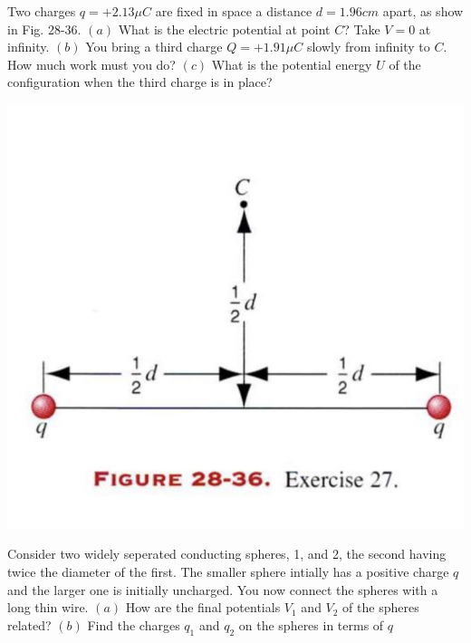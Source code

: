 \documentclass[11pt,letterpaper,boxed]{hmcpset}
\begin{document}
\begin{problem}[HRK P28.27	]
Two  charges  $q= +2.13 \mu C$ are fixed in space a distance $d= 1.96 cm$ apart, as show in Fig. 28-36. $(a)$ What is the electric potential at point $C$? Take $V= 0$ at infinity. $(b)$ You bring a third charge $Q = + 1.91 \mu C$ slowly from infinity to $C$. How much work must you do? $(c)$ What is the potential energy $U$ of the configuration when the third charge is in place?
\begin{center}
\includegraphics[scale=0.6]{28-36.png}
\end{center}
\end{problem}

\begin{solution}
\vfill
\end{solution}
\newpage

\begin{problem}[HRK P28.42]
Consider two widely seperated conducting spheres, 1, and 2, the second having twice the diameter of the first. The smaller sphere intially has a positive charge $q$ and the larger one is initially uncharged. You now connect the spheres with a long  thin wire. $(a)$ How are the final potentials $V_1$ and $V_2$ of the spheres related? $(b)$ Find the charges $q_1$ and $q_2$ on the spheres in terms of $q$ 
\end{problem}

\begin{solution}
\vfill
\end{solution}
\newpage
\end{document}
